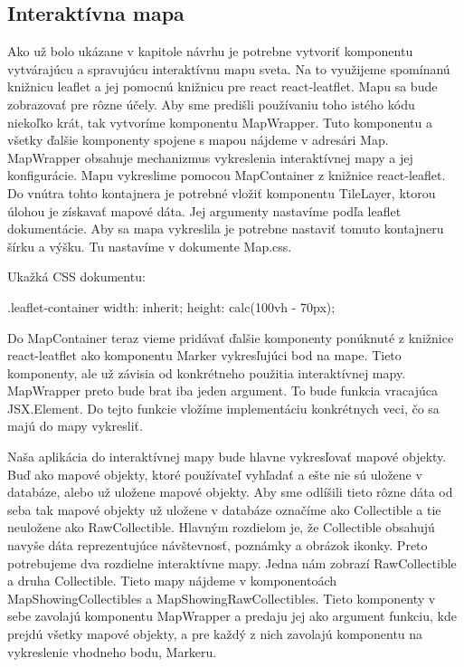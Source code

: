 \subsection*{Interaktívna mapa}
Ako už bolo ukázane v kapitole návrhu je potrebne vytvoriť komponentu vytvárajúcu a spravujúcu interaktívnu mapu sveta. Na to využijeme spomínanú knižnicu leaflet a jej pomocnú knižnicu pre react react-leatflet. 
Mapu sa bude zobrazovať pre rôzne účely. Aby sme predišli používaniu toho istého kódu niekoľko krát, tak vytvoríme komponentu MapWrapper. Tuto komponentu a všetky ďalšie  
komponenty spojene s mapou  nájdeme v adresári Map. 
MapWrapper obsahuje mechanizmus vykreslenia interaktívnej mapy a jej konfigurácie. Mapu vykreslime pomocou MapContainer z knižnice react-leaflet. Do vnútra tohto kontajnera je potrebné  
vložiť komponentu TileLayer, ktorou úlohou je získavať mapové dáta. Jej argumenty nastavíme podľa leaflet dokumentácie. Aby sa mapa vykreslila je potrebne  
nastaviť tomuto kontajneru šírku a výšku. Tu nastavíme v dokumente Map.css. 

Ukažká CSS dokumentu:
\begin{code}
.leaflet-container {
    width: inherit;
    height: calc(100vh - 70px);
}
\end{code}

Do MapContainer teraz vieme pridávať ďalšie komponenty ponúknuté z knižnice react-leatflet ako komponentu Marker vykresľujúci bod na mape. Tieto komponenty, ale už závisia od konkrétneho použitia 
interaktívnej mapy. MapWrapper preto bude brat iba jeden argument. To bude funkcia vracajúca JSX.Element. Do tejto funkcie vložíme implementáciu konkrétnych veci, čo sa majú do mapy vykresliť. 

Naša aplikácia do interaktívnej mapy bude hlavne vykresľovať mapové objekty. Buď ako mapové objekty, ktoré používateľ vyhľadať a ešte nie sú uložene v databáze, alebo už uložene mapové objekty. 
Aby sme odlíšili tieto rôzne dáta od seba tak mapové objekty už uložene v databáze označíme ako Collectible a tie neuložene ako RawCollectible. Hlavným rozdielom je, že Collectible 
obsahujú navyše dáta reprezentujúce návštevnosť, poznámky a obrázok ikonky. Preto potrebujeme dva rozdielne interaktívne mapy. Jedna nám zobrazí RawCollectible a druha Collectible. 
Tieto mapy nájdeme v komponentoách MapShowingCollectibles a MapShowingRawCollectibles. Tieto komponenty v sebe zavolajú komponentu MapWrapper a predaju jej ako argument funkciu, kde 
prejdú všetky mapové objekty, a pre každý z nich zavolajú komponentu na vykreslenie vhodneho bodu, Markeru. 

